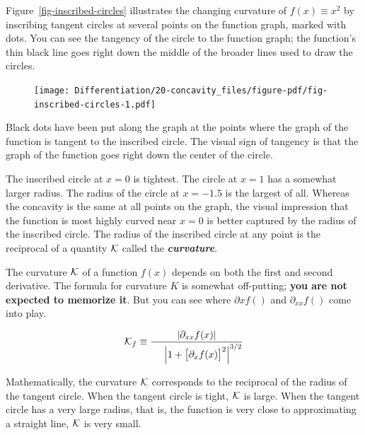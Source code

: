 \documentclass[
  letterpaper,
  DIV=11,
  numbers=noendperiod,
  oneside]{scrreprt}
\begin{document}
Figure~\ref{fig-inscribed-circles} illustrates the changing curvature of
\(f(x) \equiv x^2\) by inscribing tangent circles at several points on
the function graph, marked with dots. You can see the tangency of the
circle to the function graph; the function's thin black line goes right
down the middle of the broader lines used to draw the circles.

\begin{figure}


{\centering \texttt{[image: Differentiation/20-concavity\_files/figure-pdf/fig-inscribed-circles-1.pdf]}

}

\end{figure}

Black dots have been put along the graph at the points where the graph
of the function is tangent to the inscribed circle. The visual sign of
tangency is that the graph of the function goes right down the center of
the circle.

The inscribed circle at \(x=0\) is tightest. The circle at \(x=1\) has a
somewhat larger radius. The radius of the circle at \(x=-1.5\) is the
largest of all. Whereas the concavity is the same at all points on the
graph, the visual impression that the function is most highly curved
near \(x=0\) is better captured by the radius of the inscribed circle.
The radius of the inscribed circle at any point is the reciprocal of a
quantity \({\cal K}\) called the \textbf{\emph{curvature}}.

The curvature \({\cal K}\) of a function \(f(x)\) depends on both the
first and second derivative. The formula for curvature \(K\) is somewhat
off-putting; \textbf{you are not expected to memorize it}. But you can
see where \(\partial x f()\) and \(\partial_{xx}f()\) come into play.

\[{\cal K}_f  \equiv \frac{\left|\partial_{xx} f(x)\right|}{\ \ \ \ \left|1 + \left[\strut\partial_x f(x)\right]^2\right|^{3/2}}\]

Mathematically, the curvature \(\cal K\) corresponds to the reciprocal
of the radius of the tangent circle. When the tangent circle is tight,
\(\cal K\) is large. When the tangent circle has a very large radius,
that is, the function is very close to approximating a straight line,
\(\cal K\) is very small.
\end{document}
